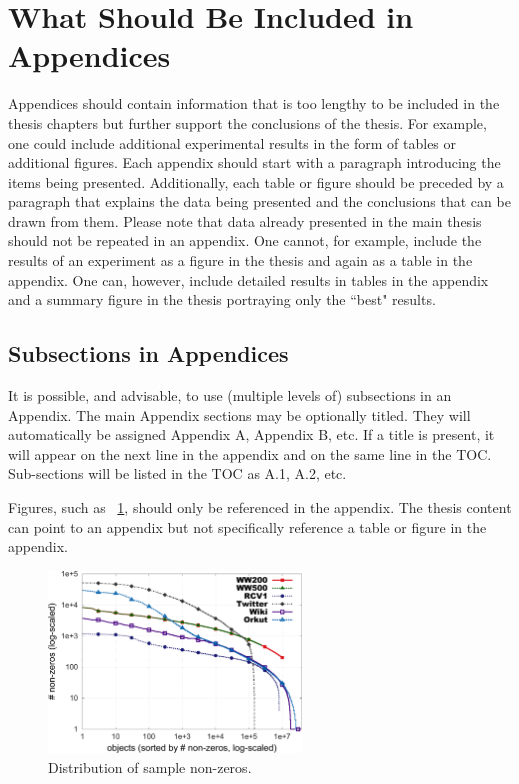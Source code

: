 

\section{What Should Be Included in Appendices}\label{apx:appendix1}

Appendices should contain information that is too lengthy to be included in the thesis chapters but further support the conclusions of the thesis. For example, one could include additional experimental results in the form of tables or additional figures. Each appendix should start with a paragraph introducing the items being presented. Additionally, each table or figure should be preceded by a paragraph that explains the data being presented and the conclusions that can be drawn from them. Please note that data already presented in the main thesis should not be repeated in an appendix. One cannot, for example, include the results of an experiment as a figure in the thesis and again as a table in the appendix. One can, however, include detailed results in tables in the appendix and a summary figure in the thesis portraying only the ``best" results.

\subsection{Subsections in Appendices}\label{apx:appendix1:subsections}

It is possible, and advisable, to use (multiple levels of) subsections in an Appendix. The main Appendix sections may be optionally titled. They will automatically be assigned Appendix A, Appendix B, etc. If a title is present, it will appear on the next line in the appendix and on the same line in the TOC. Sub-sections will be listed in the TOC as A.1, A.2, etc.

Figures, such as \figurename~\ref{fig:nonzero-distr}, should only be referenced in the appendix. The thesis content can point to an appendix but not specifically reference a table or figure in the appendix.

\begin{figure}[tbh]
  \centering
  \includegraphics[width=0.6\textwidth]{figures/hist-rows.pdf}
  \caption{Distribution of sample non-zeros.}
  \label{fig:nonzero-distr}
\end{figure}


